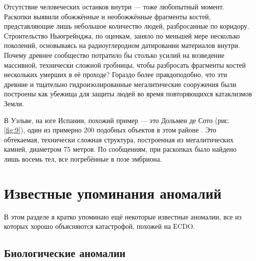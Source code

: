 \documentclass[10pt,twocolumn,letterpaper]{article}
\begin{document}
Отсутствие человеческих останков внутри — тоже любопытный момент. Раскопки выявили обожжённые и необожжённые фрагменты костей, представляющие лишь небольшое количество людей, разбросанные по коридору. Строительство Ньюгрейнджа, по оценкам, заняло по меньшей мере несколько поколений, основываясь на радиоуглеродном датировании материалов внутри. Почему древнее сообщество потратило бы столько усилий на возведение массивной, технически сложной гробницы, чтобы разбросать фрагменты костей нескольких умерших в её проходе? Гораздо более правдоподобно, что эти древние и тщательно гидроизолированные мегалитические сооружения были построены как убежища для защиты людей во время повторяющихся катаклизмов Земли.

В Уэльве, на юге Испании, похожий пример — это Дольмен де Сото (рис. \ref{fig:9}), один из примерно 200 подобных объектов в этом районе \cite{72,32}. Это обтекаемая, технически сложная структура, построенная из мегалитических камней, диаметром 75 метров. По сообщениям, при раскопках было найдено лишь восемь тел, все погребённые в позе эмбриона.

\section{Известные упоминания аномалий}

В этом разделе я кратко упоминаю ещё некоторые известные аномалии, все из которых хорошо объясняются катастрофой, похожей на ЕCDO.

\subsection{Биологические аномалии}
\end{document}
